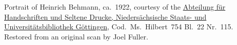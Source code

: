 Portrait of Heinrich Behmann, ca.~1922, courtesy of the
\href{http://www.sub.uni-goettingen.de/en/contact/departments-a-z/departmental-and-unit-details/abteilunggruppe/handschriften-und-seltene-drucke/}{Abteilung
f\"ur Handschriften und Seltene Drucke, Nieders\"achsische Staats- und
Universit\"atsbibliothek G\"ottingen}, Cod.\ Ms.\ Hilbert~754 Bl.~22
Nr.~115. Restored from an original scan by Joel Fuller.
